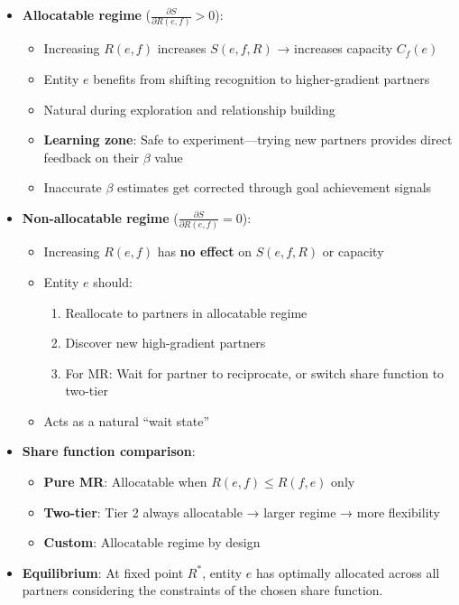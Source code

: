\documentclass[11pt,a4paper]{article}
\theoremstyle{definition}
\theoremstyle{remark}
\begin{document}
\begin{itemize}
\item \textbf{Allocatable regime} ($\frac{\partial S}{\partial R(e,f)} > 0$): 
  \begin{itemize}
  \item Increasing $R(e,f)$ increases $S(e,f,R)$ → increases capacity $C_f(e)$
  \item Entity $e$ benefits from shifting recognition to higher-gradient partners
  \item Natural during exploration and relationship building
  \item \textbf{Learning zone}: Safe to experiment---trying new partners provides direct feedback on their $\beta$ value
  \item Inaccurate $\beta$ estimates get corrected through goal achievement signals
  \end{itemize}

\item \textbf{Non-allocatable regime} ($\frac{\partial S}{\partial R(e,f)} = 0$):
  \begin{itemize}
  \item Increasing $R(e,f)$ has \textbf{no effect} on $S(e,f,R)$ or capacity
  \item Entity $e$ should:
    \begin{enumerate}
    \item Reallocate to partners in allocatable regime
    \item Discover new high-gradient partners
    \item For MR: Wait for partner to reciprocate, or switch share function to two-tier
    \end{enumerate}
  \item Acts as a natural ``wait state''
  \end{itemize}

\item \textbf{Share function comparison}:
  \begin{itemize}
  \item \textbf{Pure MR}: Allocatable when $R(e,f) \le R(f,e)$ only
  \item \textbf{Two-tier}: Tier 2 always allocatable → larger regime → more flexibility
  \item \textbf{Custom}: Allocatable regime by design
  \end{itemize}

\item \textbf{Equilibrium}: At fixed point $R^*$, entity $e$ has optimally allocated across all partners considering the constraints of the chosen share function.
\end{itemize}
\end{document}
